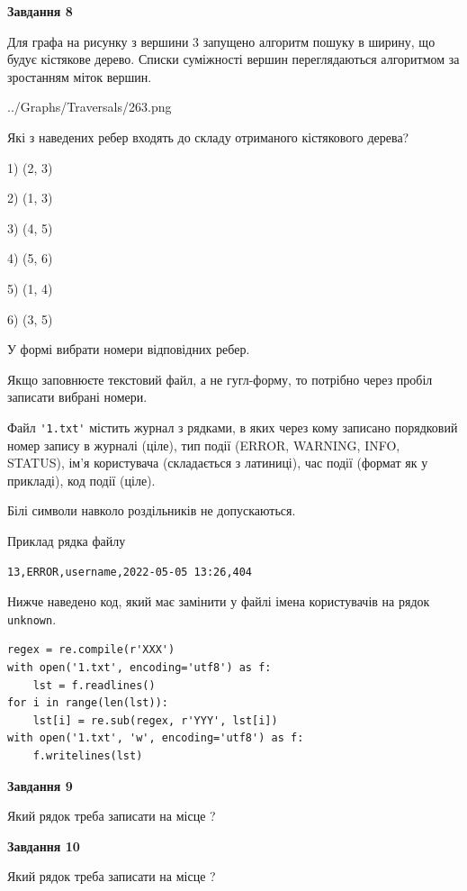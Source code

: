 \documentclass[12pt, ukrainian]{article}
\def\code#1{\Verb!#1!}
\begin{document}
{\begin {large}
{\begin {center}\textbf{Завдання 8}\end {center}}\par
Для графа на рисунку з вершини 3 запущено алгоритм пошуку в ширину, що будує кістякове дерево. Списки суміжності вершин переглядаються алгоритмом за зростанням міток вершин.\par
\begin{center}
	{../Graphs/Traversals/263.png}
\end{center}
\par Які з наведених ребер входять до складу отриманого кістякового дерева?\par
1) (2, 3)\par
2) (1, 3)\par
3) (4, 5)\par
4) (5, 6)\par
5) (1, 4)\par
6) (3, 5)\par
{\vskip 15pt} У формі вибрати номери відповідних ребер.


Якщо заповнюєте текстовий файл, а не гугл-форму, то потрібно через пробіл записа\-ти вибрані номери.\par
\newpage


Файл \code{'1.txt'} містить журнал з рядками, в яких через кому записано поряд\-ко\-вий номер запису в журналі (ціле), тип події (ERROR, WARNING, INFO, STATUS), ім'я користувача (складається з латиниці), час події (фор\-мат як у прикладі), код події (ціле).

Білі символи навколо роздільників не допускаються.

Приклад рядка файлу



\begin{verbatim}
13,ERROR,username,2022-05-05 13:26,404
\end{verbatim}


Нижче наведено код, який має замінити у файлі імена користувачів на рядок \code{unknown}.



\begin{verbatim}
regex = re.compile(r'XXX')
with open('1.txt', encoding='utf8') as f:
    lst = f.readlines()
for i in range(len(lst)):
    lst[i] = re.sub(regex, r'YYY', lst[i])
with open('1.txt', 'w', encoding='utf8') as f:
    f.writelines(lst)
\end{verbatim}




{\begin {center}\textbf{Завдання 9}\end {center}}\par
Який рядок треба записати на місце  ?\par
\vspace{5mm}


{\begin {center}\textbf{Завдання 10}\end {center}}\par
Який рядок треба записати на місце  ?\par


\newpage


\end {large}}
\end{document}
